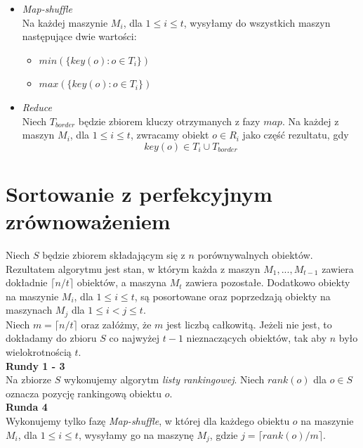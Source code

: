 \documentclass[licencjacka]{pracamgr}
\begin{document}
\begin{itemize}
    \item \textit{Map-shuffle} \\
    Na każdej maszynie \(M_i\), dla \(1 \leq i \leq t\), wysyłamy do wszystkich maszyn następujące dwie wartości:
        \begin{itemize}
            \item \(min(\{key(o): o \in T_i\})\)
            \item \(max(\{key(o): o \in T_i\})\)
        \end{itemize}
    \item \textit{Reduce} \\
    Niech \(T_{border}\) będzie zbiorem kluczy otrzymanych z fazy \(map\). Na każdej z maszyn \(M_i\), dla \(1 \leq i \leq t\), zwracamy obiekt \(o \in R_i\) jako część rezultatu, gdy
            $$key(o) \in T_i \cup T_{border}$$

\end{itemize}

\section{Sortowanie z perfekcyjnym zrównoważeniem} \label{perfect_sort}

Niech \(S\) będzie zbiorem składającym się z \(n\) porównywalnych obiektów. Rezultatem algorytmu jest stan, w którym każda z maszyn \(M_1, ..., M_{t-1}\) zawiera dokładnie \( \lceil n / t \rceil\) obiektów, a maszyna \(M_t\) zawiera pozostałe. Dodatkowo obiekty na maszynie \(M_i\), dla \(1 \leq i \leq t\), są posortowane oraz poprzedzają obiekty na maszynach \(M_j\) dla \(1 \leq i < j \leq t\). \\

Niech \(m = \lceil n / t \rceil\) oraz załóżmy, że \(m\) jest liczbą całkowitą. Jeżeli nie jest, to dokładamy do zbioru \(S\) co najwyżej \(t - 1\) nieznaczących obiektów, tak aby \(n\) było wielokrotnością \(t\). \\

\textbf{Rundy 1 - 3} \\
Na zbiorze \(S\) wykonujemy algorytm \textit{listy rankingowej}. Niech \(rank(o)\) dla \(o \in S\) oznacza pozycję rankingową obiektu \(o\). \\

\textbf{Runda 4} \\
Wykonujemy tylko fazę \textit{Map-shuffle}, w której dla każdego obiektu \(o\) na maszynie \(M_i\), dla \(1 \leq i \leq t\), wysyłamy go na maszynę \(M_j\), gdzie \(j = \lceil rank(o) / m \rceil\).
\end{document}
